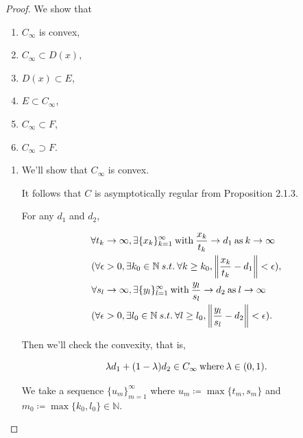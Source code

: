 \documentclass[a4paper,11pt]{jsarticle}
\newcommand{\NaturalNumberSet}{\mathbb{N}}
\begin{document}
\begin{proof}
  We show that

  \begin{enumerate}[label=\roman*,align=CenterWithParen]
    \item $C_{\infty}$ is convex,
    \item $C_{\infty} \subset D(x)$,
    \item $D(x) \subset E$,
    \item $E \subset C_{\infty}$,
    \item $C_{\infty} \subset F$,
    \item $C_{\infty} \supset F$.
  \end{enumerate}

  \begin{enumerate}[label=\roman*,align=CenterWithParen]
    \item We'll show that $C_{\infty}$ is convex.

    It follows that $C$ is asymptotically regular from Proposition 2.1.3.

    For any $d_1$ and $d_2$,

    \begin{equation}
      \begin{split}
        \forall t_k &\rightarrow \infty, \exists \{x_k\}_{k=1}^{\infty} \:\text{with}\: \frac{x_k}{t_k} \rightarrow d_1 \:\text{as}\: k \rightarrow \infty \\
        (\forall \epsilon &> 0, \exists k_0 \in \NaturalNumberSet \:s.t.\: \forall k \geq k_0, \left\lVert \frac{x_k}{t_k} - d_1\right\rVert < \epsilon ), \\
        \forall s_l &\rightarrow \infty, \exists \{y_l\}_{l=1}^{\infty} \:\text{with}\: \frac{y_l}{s_l} \rightarrow d_2 \:\text{as}\: l \rightarrow \infty \\
        (\forall \epsilon &> 0, \exists l_0 \in \NaturalNumberSet \:s.t.\: \forall l \geq l_0, \left\lVert \frac{y_l}{s_l} - d_2\right\rVert < \epsilon ). \notag
      \end{split}
    \end{equation}

    Then we'll check the convexity, that is,

    \begin{equation}
      \lambda d_1 + (1 - \lambda) d_2 \in C_{\infty} \:\text{where}\: \lambda \in (0,1). \notag
    \end{equation}

    We take a sequence $\{u_m\}_{m=1}^{\infty}$ where $u_m \coloneqq \max \{t_m,s_m\}$ and $m_0 \coloneqq \max \{k_0,l_0\} \in \NaturalNumberSet$.


\end{enumerate}
\end{proof}
\end{document}

